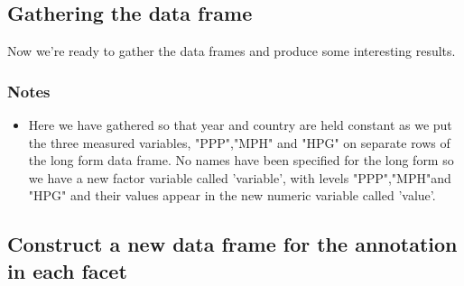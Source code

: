 \documentclass[titlepage]{book}\usepackage{knitr}
\begin{document}
\subsection{Gathering the data frame}
Now we're ready to gather the data frames and produce some interesting results.
\begin{knitrout}
\color{fgcolor}\begin{kframe}
\begin{alltt}
 \hlkwb{<-}       

\hlstd{)}
\end{alltt}
\end{kframe}
\end{knitrout}
\subsubsection{Notes}
\begin{itemize}
\item{Here we have gathered so that year and country are held constant as we put the three measured variables, "PPP","MPH" and "HPG" on separate rows of the long form data frame. No names have been specified for the long form so we  have a new factor variable called 'variable', with levels "PPP","MPH"and "HPG" and their values  appear in the new numeric variable called 'value'.}
\end{itemize}

\subsection{Construct a new data frame for the annotation in each facet}
\begin{knitrout}
\color{fgcolor}\begin{kframe}
\begin{alltt}
 \hlkwb{<-} \hlstd{(}  \hlstd{=} \hlopt{$}                           
                    \hlstd{=} \hlstd{(}\hlstd{,} \hlstd{),}
                    \hlstd{=} \hlstd{(}\hlstd{,} \hlstd{),}                                       
                    \hlstd{=} \hlstd{(}\hlstd{,} 
\hlopt{$} \hlkwb{<-} \hlopt{$}                                         
\end{alltt}
\end{kframe}
\end{knitrout}
\end{document}
